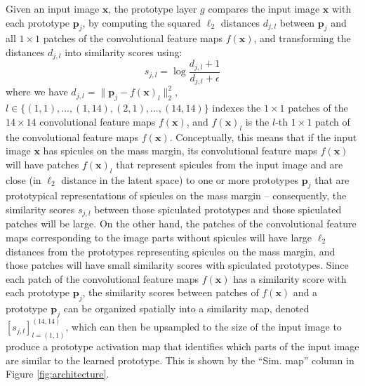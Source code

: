 \documentclass[11pt]{article}
\begin{document}
Given an input image $\mathbf{x}$, the prototype layer $g$ compares the input image $\mathbf{x}$ with each prototype $\mathbf{p}_j$, by computing the squared $\ell_2$ distances $d_{j,l}$ between $\mathbf{p}_j$ and all $1 \times 1$ patches of the convolutional feature maps $f(\mathbf{x})$, and transforming the distances $d_{j,l}$ into similarity scores using:
\[
s_{j,l} = \log\frac{d_{j,l}+1}{d_{j,l}+\epsilon}
\]
where we have $d_{j,l} = \|\mathbf{p}_j-f(\mathbf{x})_l\|_2^2$, $l \in \{(1,1),...,(1,14),(2,1),...,(14,14)\}$ indexes the $1 \times 1$ patches of the $14 \times 14$ convolutional feature maps $f(\mathbf{x})$, and $f(\mathbf{x})_l$ is the $l$-th $1 \times 1$ patch of the convolutional feature maps $f(\mathbf{x})$. Conceptually, this means that if the input image $\mathbf{x}$ has spicules on the mass margin, its convolutional feature maps $f(\mathbf{x})$ will have patches $f(\mathbf{x})_l$ that represent spicules from the input image and are close (in $\ell_2$ distance in the latent space) to one or more prototypes $\mathbf{p}_j$ that are prototypical representations of spicules on the mass margin -- consequently, the similarity scores $s_{j,l}$ between those spiculated prototypes and those spiculated patches will be large. On the other hand, the patches of the convolutional feature maps corresponding to the image parts without spicules will have large $\ell_2$ distances from the prototypes representing spicules on the mass margin, and those patches will have small similarity scores with spiculated prototypes. Since each patch of the convolutional feature maps $f(\mathbf{x})$ has a similarity score with each prototype $\mathbf{p}_j$, the similarity scores between patches of $f(\mathbf{x})$ and a prototype $\mathbf{p}_j$ can be organized spatially into a similarity map, denoted $[s_{j,l}]_{l=(1,1)}^{(14,14)}$, which can then be upsampled to the size of the input image to produce a prototype activation map that identifies which parts of the input image are similar to the learned prototype. This is shown by the ``Sim. map'' column in Figure \ref{fig:architecture}.
\end{document}

